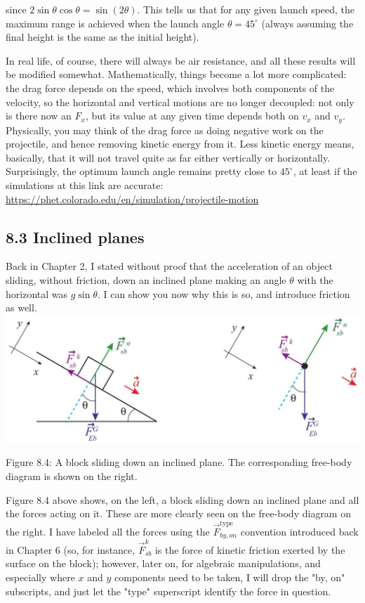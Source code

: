 \documentclass[10pt]{article}
\begin{document}
since $2 \sin \theta \cos \theta=\sin (2 \theta)$. This tells us that for any given launch speed, the maximum range is achieved when the launch angle $\theta=45^{\circ}$ (always assuming the final height is the same as the initial height).

In real life, of course, there will always be air resistance, and all these results will be modified somewhat. Mathematically, things become a lot more complicated: the drag force depends on the speed, which involves both components of the velocity, so the horizontal and vertical motions are no longer decoupled: not only is there now an $F_{x}$, but its value at any given time depends both on $v_{x}$ and $v_{y}$. Physically, you may think of the drag force as doing negative work on the projectile, and hence removing kinetic energy from it. Less kinetic energy means, basically, that it will not travel quite as far either vertically or horizontally. Surprisingly, the optimum launch angle remains pretty close to $45^{\circ}$, at least if the simulations at this link are accurate:\\
\href{https://phet.colorado.edu/en/simulation/projectile-motion}{https://phet.colorado.edu/en/simulation/projectile-motion}

\subsection*{8.3 Inclined planes}
Back in Chapter 2, I stated without proof that the acceleration of an object sliding, without friction, down an inclined plane making an angle $\theta$ with the horizontal was $g \sin \theta$. I can show you now why this is so, and introduce friction as well.\\
\includegraphics[max width=\textwidth, center]{2024_09_14_9969b06773f10b6936e8g-185}

Figure 8.4: A block sliding down an inclined plane. The corresponding free-body diagram is shown on the right.

Figure 8.4 above shows, on the left, a block sliding down an inclined plane and all the forces acting on it. These are more clearly seen on the free-body diagram on the right. I have labeled all the forces using the $\vec{F}_{b y, o n}^{\text {type }}$ convention introduced back in Chapter 6 (so, for instance, $\vec{F}_{s b}^{k}$ is the force of kinetic friction exerted by the surface on the block); however, later on, for algebraic manipulations, and especially where $x$ and $y$ components need to be taken, I will drop the "by, on" subscripts, and just let the "type" superscript identify the force in question.
\end{document}
